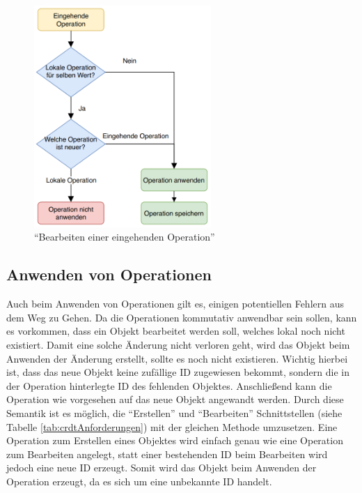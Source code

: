 \documentclass[a4paper, 12pt]{scrreprt}
\begin{document}
\begin{figure}[H]
	\centering
	\includegraphics[width=0.6\textwidth]{flowchartOperationen.png}
	\caption{\enquote{Bearbeiten einer eingehenden Operation}}
	\label{fig:flwochartOperationen}
\end{figure}

\subsection{Anwenden von Operationen}

Auch beim Anwenden von Operationen gilt es, einigen potentiellen Fehlern aus dem Weg zu Gehen. Da die Operationen kommutativ anwendbar sein sollen, kann es vorkommen, dass ein Objekt bearbeitet werden soll, welches lokal noch nicht existiert. Damit eine solche Änderung nicht verloren geht, wird das Objekt beim Anwenden der Änderung erstellt, sollte es noch nicht existieren. Wichtig hierbei ist, dass das neue Objekt keine zufällige ID zugewiesen bekommt, sondern die in der Operation hinterlegte ID des fehlenden Objektes. Anschließend kann die Operation wie vorgesehen auf das neue Objekt angewandt werden. Durch diese Semantik ist es möglich, die \enquote{Erstellen} und \enquote{Bearbeiten} Schnittstellen (siehe Tabelle \ref{tab:crdtAnforderungen}) mit der gleichen Methode umzusetzen. Eine Operation zum Erstellen eines Objektes wird einfach genau wie eine Operation zum Bearbeiten angelegt, statt einer bestehenden ID beim Bearbeiten wird jedoch eine neue ID erzeugt. Somit wird das Objekt beim Anwenden der Operation erzeugt, da es sich um eine unbekannte ID handelt. 
\end{document}
